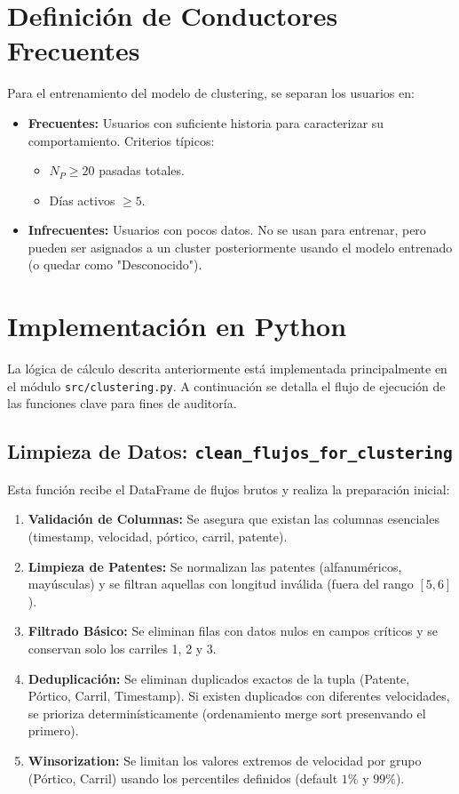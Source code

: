 \section{Definición de Conductores Frecuentes}
Para el entrenamiento del modelo de clustering, se separan los usuarios en:
\begin{itemize}
    \item \textbf{Frecuentes:} Usuarios con suficiente historia para caracterizar su comportamiento. Criterios típicos:
    \begin{itemize}
        \item $N_P \ge 20$ pasadas totales.
        \item Días activos $\ge 5$.
    \end{itemize}
    \item \textbf{Infrecuentes:} Usuarios con pocos datos. No se usan para entrenar, pero pueden ser asignados a un cluster posteriormente usando el modelo entrenado (o quedar como "Desconocido").
\end{itemize}

\section{Implementación en Python}
La lógica de cálculo descrita anteriormente está implementada principalmente en el módulo \texttt{src/clustering.py}. A continuación se detalla el flujo de ejecución de las funciones clave para fines de auditoría.

\subsection{Limpieza de Datos: \texttt{clean\_flujos\_for\_clustering}}
Esta función recibe el DataFrame de flujos brutos y realiza la preparación inicial:
\begin{enumerate}
    \item \textbf{Validación de Columnas:} Se asegura que existan las columnas esenciales (timestamp, velocidad, pórtico, carril, patente).
    \item \textbf{Limpieza de Patentes:} Se normalizan las patentes (alfanuméricos, mayúsculas) y se filtran aquellas con longitud inválida (fuera del rango $[5, 6]$).
    \item \textbf{Filtrado Básico:} Se eliminan filas con datos nulos en campos críticos y se conservan solo los carriles 1, 2 y 3.
    \item \textbf{Deduplicación:} Se eliminan duplicados exactos de la tupla (Patente, Pórtico, Carril, Timestamp). Si existen duplicados con diferentes velocidades, se prioriza determinísticamente (ordenamiento merge sort presenvando el primero).
    \item \textbf{Winsorization:} Se limitan los valores extremos de velocidad por grupo (Pórtico, Carril) usando los percentiles definidos (default $1\%$ y $99\%$).
\end{enumerate}

